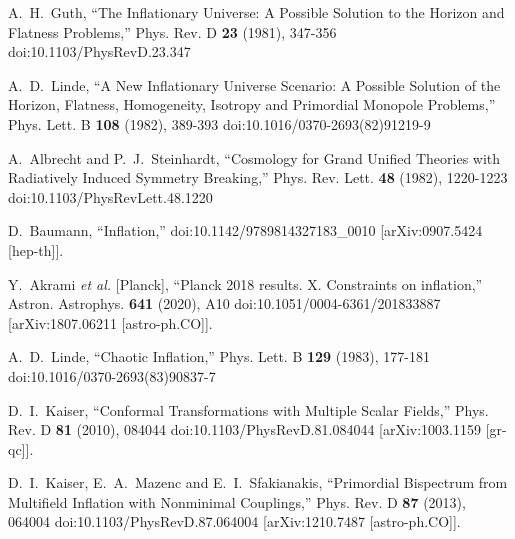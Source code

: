 \documentclass[a4paper,11pt]{article}
\begin{document}
\begin{thebibliography}{10}

A.~H.~Guth,
``The Inflationary Universe: A Possible Solution to the Horizon and Flatness Problems,''
Phys. Rev. D \textbf{23} (1981), 347-356
doi:10.1103/PhysRevD.23.347

A.~D.~Linde,
``A New Inflationary Universe Scenario: A Possible Solution of the Horizon, Flatness, Homogeneity, Isotropy and Primordial Monopole Problems,''
Phys. Lett. B \textbf{108} (1982), 389-393
doi:10.1016/0370-2693(82)91219-9

A.~Albrecht and P.~J.~Steinhardt,
``Cosmology for Grand Unified Theories with Radiatively Induced Symmetry Breaking,''
Phys. Rev. Lett. \textbf{48} (1982), 1220-1223
doi:10.1103/PhysRevLett.48.1220

D.~Baumann,
``Inflation,''
doi:10.1142/9789814327183\_0010
[arXiv:0907.5424 [hep-th]].

Y.~Akrami \textit{et al.} [Planck],
``Planck 2018 results. X. Constraints on inflation,''
Astron. Astrophys. \textbf{641} (2020), A10
doi:10.1051/0004-6361/201833887
[arXiv:1807.06211 [astro-ph.CO]].

A.~D.~Linde,
``Chaotic Inflation,''
Phys. Lett. B \textbf{129} (1983), 177-181
doi:10.1016/0370-2693(83)90837-7

D.~I.~Kaiser,
``Conformal Transformations with Multiple Scalar Fields,''
Phys. Rev. D \textbf{81} (2010), 084044
doi:10.1103/PhysRevD.81.084044
[arXiv:1003.1159 [gr-qc]].

D.~I.~Kaiser, E.~A.~Mazenc and E.~I.~Sfakianakis,
``Primordial Bispectrum from Multifield Inflation with Nonminimal Couplings,''
Phys. Rev. D \textbf{87} (2013), 064004
doi:10.1103/PhysRevD.87.064004
[arXiv:1210.7487 [astro-ph.CO]].


\end{thebibliography}
\end{document}

